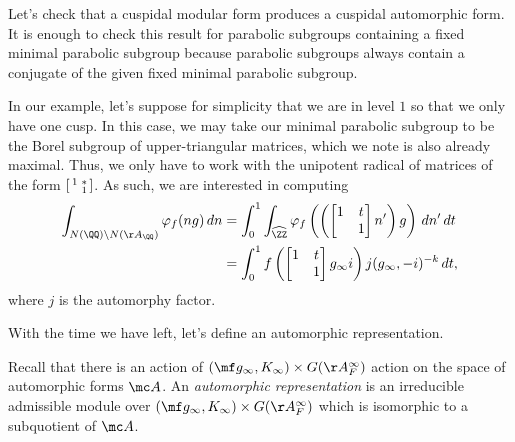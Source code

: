 \documentclass{article}
\begin{document}
\begin{listalph}
	\item Let's check that a cuspidal modular form produces a cuspidal automorphic form. It is enough to check this result for parabolic subgroups containing a fixed minimal parabolic subgroup because parabolic subgroups always contain a conjugate of the given fixed minimal parabolic subgroup.
	
	In our example, let's suppose for simplicity that we are in level $1$ so that we only have one cusp. In this case, we may take our minimal parabolic subgroup to be the Borel subgroup of upper-triangular matrices, which we note is also already maximal. Thus, we only have to work with the unipotent radical of matrices of the form $\begin{bsmallmatrix}
		1 & * \\ & 1
	\end{bsmallmatrix}$. As such, we are interested in computing
	\begin{align*}
		\int_{N(\QQ)\backslash N(\AA_\QQ)}\varphi_f(ng)\,dn &= \int_0^1\int_{\widehat\ZZ}\varphi_f\left(\left(\begin{bmatrix}
			1 & t \\ & 1
		\end{bmatrix}n'\right)g\right)\,dn'\,dt \\
		&= \int_0^1f\left(\begin{bmatrix}
			1 & t \\ & 1
		\end{bmatrix}g_\infty i\right)j(g_\infty,-i)^{-k}\,dt,
	\end{align*}
	where $j$ is the automorphy factor.
\end{listalph}
With the time we have left, let's define an automorphic representation.
\begin{definition}
	Recall that there is an action of $(\mf g_\infty,K_\infty)\times G(\AA_F^\infty)$ action on the space of automorphic forms $\mc A$. An \textit{automorphic representation} is an irreducible admissible module over $(\mf g_\infty,K_\infty)\times G(\AA_F^\infty)$ which is isomorphic to a subquotient of $\mc A$.
\end{definition}
\end{document}
